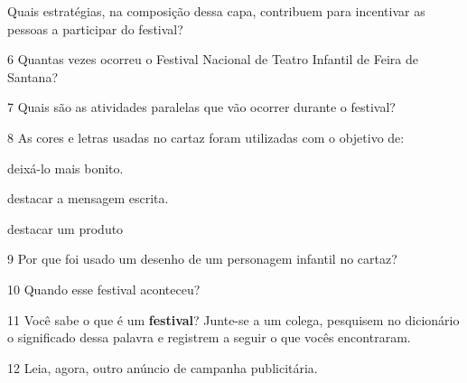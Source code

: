 \begin{conteudo}
\begin{conteudo}
\begin{conteudo}
\begin{conteudo}
Quais estratégias, na composição dessa capa, contribuem para
incentivar as pessoas a participar do festival?


\num{6} Quantas vezes ocorreu o Festival Nacional de Teatro Infantil de
Feira de Santana?


\num{7} Quais são as atividades paralelas que vão ocorrer durante o festival?


\pagebreak
\num{8} As cores e letras usadas no cartaz foram utilizadas com o objetivo de:

\begin{boxlist}
 deixá-lo mais bonito.

 destacar a mensagem escrita.

 destacar um produto
\end{boxlist}

\num{9} Por que foi usado um desenho de um personagem infantil no cartaz?


\num{10} Quando esse festival aconteceu? 



\num{11} Você sabe o que é um \textbf{festival}? Junte-se a um colega,
pesquisem no dicionário o significado dessa palavra e registrem a seguir 
o que vocês encontraram.


\pagebreak
\num{12} Leia, agora, outro anúncio de campanha publicitária.



\end{conteudo}
\end{conteudo}
\end{conteudo}
\end{conteudo}
